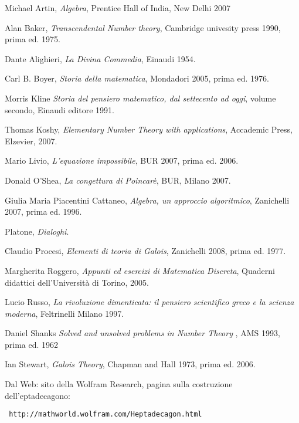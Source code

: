 

\newpage

\begin{thebibliography}{21}

Michael Artin, \emph{Algebra}, Prentice Hall of India, New Delhi 2007

Alan Baker, \emph{Transcendental Number theory}, Cambridge univesity press 1990, prima ed. 1975.

Dante Alighieri, \emph{La Divina Commedia}, Einaudi 1954.

Carl B. Boyer, \emph{Storia della matematica}, Mondadori 2005, prima ed. 1976.

Morris Kline \emph{Storia del pensiero matematico, dal settecento ad oggi}, volume secondo, Einaudi editore 1991.

Thomas Koshy, \emph{Elementary Number Theory with applications}, Accademic Press, Elzevier, 2007.

Mario Livio, \emph{L'equazione impossibile}, BUR 2007, prima ed. 2006.

Donald O'Shea, \emph{La congettura di Poincarè}, BUR, Milano 2007.

Giulia Maria Piacentini Cattaneo, \emph{Algebra, un approccio algoritmico}, Zanichelli 2007, prima ed. 1996.

Platone, \emph{Dialoghi}.

Claudio Procesi, \emph{Elementi di teoria di Galois}, Zanichelli 2008, prima ed. 1977.

Margherita Roggero, \emph{Appunti ed esercizi di Matematica Discreta}, Quaderni didattici dell'Università di Torino, 2005.

Lucio Russo, \emph{La rivoluzione dimenticata: il pensiero scientifico greco e la scienza moderna}, Feltrinelli Milano 1997.

Daniel Shanks \emph{Solved and unsolved problems in Number Theory }, AMS 1993, prima ed. 1962

Ian Stewart, \emph{Galois Theory}, Chapman and Hall 1973, prima ed. 2006.

Dal Web: sito della Wolfram Research, pagina sulla costruzione dell'eptadecagono:  \begin{verbatim} http://mathworld.wolfram.com/Heptadecagon.html \end{verbatim}


\end{thebibliography}
